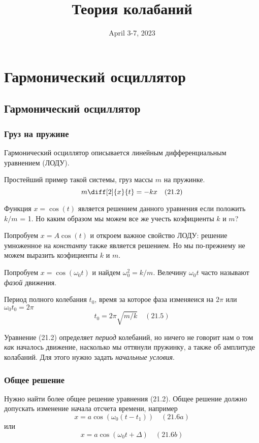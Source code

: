 \documentclass[12pt]{article}
\date{April 3-7, 2023}
\title{Теория колабаний}
\begin{document}
\maketitle

\tableofcontents

\newpage

\section{Гармонический осциллятор}

\subsection{Гармонический осциллятор}

\subsubsection{Груз на пружине}

Гармонический осциллятор описывается линейным дифференциальным уравнением (ЛОДУ).

Простейший пример такой системы, груз массы $m$ на пружинке.
\[
m\diff[2]{x}{t}=-kx \quad (21.2)
\]

Функция $x=\cos(t)$ является решением данного уравнения если положить $k/m$ = 1.
Но каким образом мы можем все же учесть коэфициенты $k$ и $m$?

Попробуем $x=A\cos(t)$ и откроем важное свойство ЛОДУ: решение умноженное на \textit{константу} также является решением. Но мы по-прежнему не можем выразить коэфициенты $k$ и $m$.

Попробуем $x=\cos(\omega_0 t)$ и найдем $\omega_0^2=k/m$. Велечину $\omega_0 t$ часто называют \textit{фазой} движения.

Период полного колебания $t_0$, время за которое фаза изменяеися на $2\pi$ или $\omega_0t_0=2\pi$
\[
    t_0=2\pi\sqrt{m/k} \quad (21.5)
\]

Уравнение (21.2) определяет \textit{период} колебаний, но ничего не говорит нам о том \textit{как} началось движение, насколько мы оттянули пружинку, а также об амплитуде колабаний. Для этого нужно задать \textit{начальные условия}.

\subsubsection{Общее решение}

Нужно найти более общее решение уравнения (21.2). Общее решение должно допускать изменение начала отсчета времени, например
\[
    x=a\cos(\omega_0(t-t_1)) \quad (21.6a)
\]
или
\[
    x=a\cos(\omega_0t+\Delta) \quad (21.6b)
\]
\end{document}
